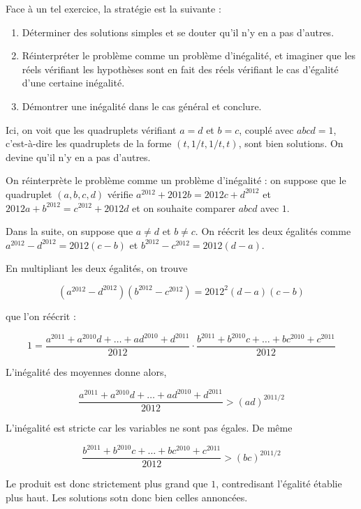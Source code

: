 \begin{sol}
Face à un tel exercice, la stratégie est la suivante : 

\begin{enumerate}
\item Déterminer des solutions simples et se douter qu'il n'y en a pas d'autres.
\item Réinterpréter le problème comme un problème d'inégalité, et imaginer que les réels vérifiant les hypothèses sont en fait des réels vérifiant le cas d'égalité d'une certaine inégalité. 
\item Démontrer une inégalité dans le cas général et conclure. 
\end{enumerate}

Ici, on voit que les quadruplets vérifiant $a=d$ et $b=c$, couplé avec $abcd=1$, c'est-à-dire les quadruplets de la forme $(t, 1/t, 1/t, t)$, sont bien solutions. On devine qu'il n'y en a pas d'autres. 

On réinterprète le problème comme un problème d'inégalité : on suppose que le quadruplet $(a,b,c,d)$ vérifie $a^{2012}+2012b=2012c+d^{2012}$ et $2012a+b^{2012}=c^{2012}+2012d$ et on souhaite comparer $abcd$ avec $1$. 

\medskip

Dans la suite, on suppose que $a\neq d$ et $b\neq c$. On réécrit les deux égalités comme $a^{2012}-d^{2012}=2012(c-b)$ et $b^{2012}-c^{2012}=2012(d-a)$. 

En multipliant les deux égalités, on trouve 

\[(a^{2012}-d^{2012})(b^{2012}-c^{2012})= 2012^2 (d-a)(c-b)\]

que l'on réécrit :

\[1= \frac{a^{2011}+a^{2010}d+ \ldots +ad^{2010}+d^{2011}}{2012} \cdot \frac{b^{2011}+b^{2010}c+ \ldots +bc^{2010}+c^{2011}}{2012}\]

L'inégalité des moyennes donne alors, 

\[ \frac{a^{2011}+a^{2010}d+ \ldots +ad^{2010}+d^{2011}}{2012} > (ad)^{2011/2}\]

L'inégalité est stricte car les variables ne sont pas égales. De même

\[\frac{b^{2011}+b^{2010}c+ \ldots +bc^{2010}+c^{2011}}{2012}> (bc)^{2011/2}\]

Le produit est donc strictement plus grand que $1$, contredisant l'égalité établie plus haut. Les solutions sotn donc bien celles annoncées. 

\end{sol}

